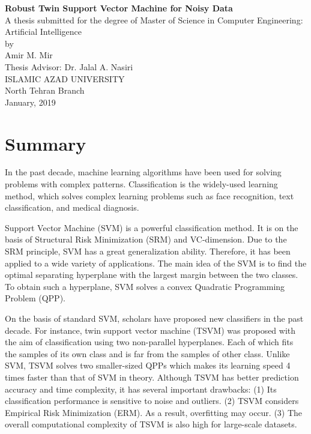 \documentclass[a4paper, 12pt]{article}
\begin{document}
	
\begin{center}
	{\Large \textbf{Robust Twin Support Vector Machine for Noisy Data}} \\[0.5cm]
	
	A thesis submitted for the degree of Master of Science in Computer Engineering: Artificial Intelligence \\[0.25cm]
	
	by \\[0.25cm]
	{\large Amir M. Mir} \\ [0.5cm]
	
	Thesis Advisor: {Dr. Jalal A. Nasiri} \\[0.25cm]
	
	ISLAMIC AZAD UNIVERSITY \\
	North Tehran Branch \\[0.25cm]
	
	January, 2019
	
\end{center}

\section*{Summary}
In the past decade, machine learning algorithms have been used for solving problems with complex patterns. Classification is the widely-used learning method, which solves complex learning problems such as face recognition, text classification, and medical diagnosis.

Support Vector Machine (SVM) is a powerful classification method. It is on the basis of Structural Risk Minimization (SRM) and VC-dimension. Due to the SRM principle, SVM has a great generalization ability. Therefore, it has been applied to a wide variety of applications. The main idea of the SVM is to find the optimal separating hyperplane with the largest margin between the two classes. To obtain such a hyperplane, SVM solves a convex Quadratic Programming Problem (QPP). 

On the basis of standard SVM, scholars have proposed new classifiers in the past decade. For instance, twin support vector machine (TSVM) was proposed with the aim of classification using two non-parallel hyperplanes. Each of which fits the samples of its own class and is far from the samples of other class. Unlike SVM, TSVM solves two smaller-sized QPPs which makes its learning speed 4 times faster than that of SVM in theory. Although TSVM has better prediction accuracy and time complexity, it has several important drawbacks: (1) Its classification performance is sensitive to noise and outliers. (2) TSVM considers Empirical Risk Minimization (ERM). As a result, overfitting may occur. (3) The overall computational complexity of TSVM is also high for large-scale datasets.
\end{document}
